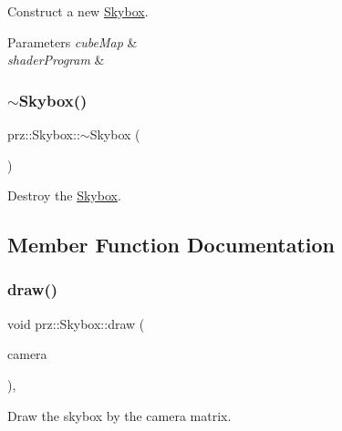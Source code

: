 Construct a new \mbox{\hyperlink{classprz_1_1_skybox}{Skybox}}. 


\begin{DoxyParams}{Parameters}
{\em cube\+Map} & \\
\hline
{\em shader\+Program} & \\
\hline
\end{DoxyParams}
\mbox{\label{classprz_1_1_skybox_aaa7b576943c21c939f3de52ef5f57043}} 
\subsubsection{\texorpdfstring{$\sim$Skybox()}{~Skybox()}}
{\footnotesize\ttfamily prz\+::\+Skybox\+::$\sim$\+Skybox (\begin{DoxyParamCaption}{ }\end{DoxyParamCaption})\hspace{0.3cm}{\ttfamily [inline]}}



Destroy the \mbox{\hyperlink{classprz_1_1_skybox}{Skybox}}. 



\subsection{Member Function Documentation}
\mbox{\label{classprz_1_1_skybox_a8a55c1baca43d28ec7d13c68828b7bb8}} 
\subsubsection{\texorpdfstring{draw()}{draw()}\hspace{0.1cm}{\footnotesize\ttfamily [1/2]}}
{\footnotesize\ttfamily void prz\+::\+Skybox\+::draw (\begin{DoxyParamCaption}\item[{P\+S\+Ptr$<$ \mbox{\hyperlink{classprz_1_1_camera}{Camera}} $>$}]{camera }\end{DoxyParamCaption})\hspace{0.3cm}{\ttfamily [override]}, {\ttfamily [virtual]}}



Draw the skybox by the camera matrix. 


